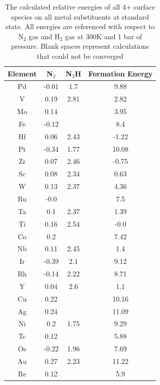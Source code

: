 \documentclass[journal=jacsat,manuscript=article]{achemso}
\begin{document}
\begin{table}
\begin{center}
\begin{tabular}{| c | c | c | c |}
\hline
Element & N$_2$ & N$_2$H & Formation Energy \\
\hline
Pd & -0.01 & 1.7 & 9.88 \\
V & 0.19 & 2.81 & 2.82 \\
Mo & 0.14 &  & 3.95 \\
Fe & -0.12 &  & 8.4 \\
Hf & 0.06 & 2.43 & -1.22 \\
Pt & -0.34 & 1.77 & 10.08 \\
Zr & 0.07 & 2.46 & -0.75 \\
Sc & 0.08 & 2.34 & 0.63 \\
W & 0.13 & 2.37 & 4.36 \\
Ru & -0.0 &  & 7.5 \\
Ta & 0.1 & 2.37 & 1.39 \\
Ti & 0.16 & 2.54 & -0.0 \\
Co & 0.2 &  & 7.42 \\
Nb & 0.11 & 2.45 & 1.4 \\
Ir & -0.39 & 2.1 & 9.12 \\
Rh & -0.14 & 2.22 & 8.71 \\
Y & 0.04 & 2.6 & 1.1 \\
Cu & 0.22 &  & 10.16 \\
Ag & 0.24 &  & 11.09 \\
Ni & 0.2 & 1.75 & 9.29 \\
Tc & 0.12 &  & 5.88 \\
Os & -0.22 & 1.96 & 7.69 \\
Au & 0.27 & 2.23 & 11.22 \\
Re & 0.12 &  & 5.9 \\
\hline
\end{tabular}
\end{center}
\label{table:4+_energies}
\caption{The calculated relative energies of all 4+ surface species on all metal substituents at standard state. All energies are referenced with respect to N$_2$ gas and H$_2$ gas at 300K and 1 bar of pressure. Blank spaces represent calculations that could not be converged}
\end{table}
\end{document}
